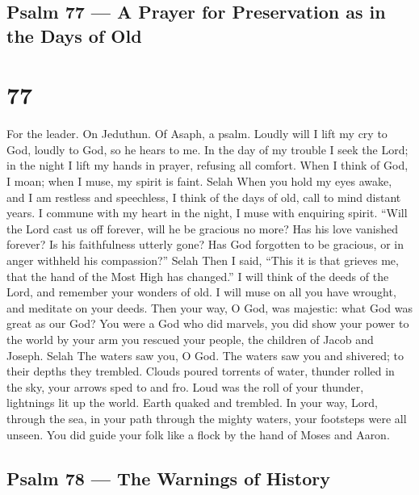 \hypertarget{psalm-77-a-prayer-for-preservation-as-in-the-days-of-old}{%
\subsection{Psalm 77 --- A Prayer for Preservation as in the Days of
Old}\label{psalm-77-a-prayer-for-preservation-as-in-the-days-of-old}}

\hypertarget{section-76}{%
\section{77}\label{section-76}}

For the leader. On Jeduthun. Of Asaph, a psalm.  Loudly will
I lift my cry to God, loudly to God, so he hears to me.  In
the day of my trouble I seek the Lord; in the night I lift my hands in
prayer, refusing all comfort.  When I think of God, I moan;
when I muse, my spirit is faint. Selah  When you hold my
eyes awake, and I am restless and speechless,  I think of
the days of old, call to mind distant years.  I commune with
my heart in the night, I muse with enquiring spirit.  ``Will
the Lord cast us off forever, will he be gracious no more? 
Has his love vanished forever? Is his faithfulness utterly gone?
 Has God forgotten to be gracious, or in anger withheld his
compassion?'' Selah  Then I said, ``This it is that grieves
me, that the hand of the Most High has changed.''  I will
think of the deeds of the Lord, and remember your wonders of old.
 I will muse on all you have wrought, and meditate on your
deeds.  Then your way, O God, was majestic: what God was
great as our God?  You were a God who did marvels, you did
show your power to the world  by your arm you rescued your
people, the children of Jacob and Joseph. Selah  The waters
saw you, O God. The waters saw you and shivered; to their depths they
trembled.  Clouds poured torrents of water, thunder rolled
in the sky, your arrows sped to and fro.  Loud was the roll
of your thunder, lightnings lit up the world. Earth quaked and trembled.
 In your way, Lord, through the sea, in your path through
the mighty waters, your footsteps were all unseen.  You did
guide your folk like a flock by the hand of Moses and Aaron.

\hypertarget{psalm-78-the-warnings-of-history}{%
\subsection{Psalm 78 --- The Warnings of
History}\label{psalm-78-the-warnings-of-history}}

